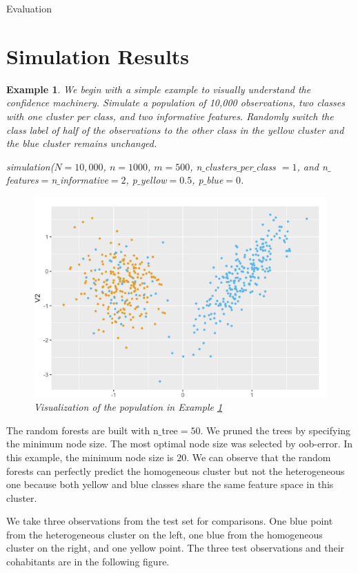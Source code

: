 \documentclass[12pt]{pom_thesis}
\newtheorem{example}{Example}[section]
\begin{document}
\begin{chapter}{Evaluation}
\section{Simulation Results}
\begin{example}
\label{example1}
We begin with a simple example to visually understand the confidence machinery. Simulate a population of 10,000 observations, two classes with one cluster per class, and two informative features. Randomly switch the class label of half of the observations to the other class in the yellow cluster and the blue cluster remains unchanged. 

 simulation($N=10,000$, $n=1000$, $m=500$, n$\_$clusters$\_$per$\_$class $= 1$, and n$\_$features$=$n$\_$informative$=2$, p$\_$yellow$=0.5$, p$\_$blue$=0$.

\begin{figure}[h]
    \centering
    \includegraphics[scale=0.5]{example1.png}
    \caption{Visualization of the population in Example \ref{example1}}
    \label{trivial example}
\end{figure}
\end{example}

The random forests are built with n$\_$tree$ = 50$. We pruned the trees by specifying the minimum node size. The most optimal node size was selected by oob-error. In this example, the minimum node size is $20$. We can observe that the random forests can perfectly predict the homogeneous cluster but not the heterogeneous one because both yellow and blue classes share the same feature space in this cluster.

We take three observations from the test set for comparisons. One blue point from the heterogeneous cluster on the left, one blue from the homogeneous cluster on the right, and one yellow point.  The three test observations and their cohabitants are in the following figure. 


\end{chapter}
\end{document}
